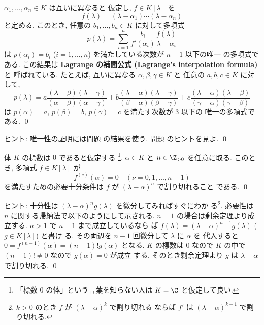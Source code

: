 \documentclass[12pt,twoside]{jarticle}
\begin{document}

\begin{question}
\label{q:Lagrange-interpolation-2}
  $\alpha_1,\dots,\alpha_n\in K$ は互いに異なると
  仮定し, $f\in K[\lambda]$ を
  \begin{equation*}
    f(\lambda)=(\lambda-\alpha_1)\cdots(\lambda-\alpha_n)
  \end{equation*}
  と定める. このとき, 任意の $b_1,\dots,b_n\in K$ に対して多項式
  \begin{equation*}
    p(\lambda) = 
    \sum_{i=1}^n 
    \frac{b_i}{f'(\alpha_i)}
    \frac{f(\lambda)}{\lambda-\alpha_i}
  \end{equation*}
  は $p(\alpha_i)=b_i$ ($i=1,\dots,n$) を満たしている次数が $n-1$ 以下の唯一
  の多項式である.
  この結果は {\bf Lagrange の補間公式 (Lagrange's interpolation formula)} と
  呼ばれている.   
  たとえば, 互いに異なる $\alpha,\beta,\gamma\in K$ と
  任意の $a,b,c\in K$ に対して,
  \begin{equation*}
    p(\lambda)=
    a \frac{(\lambda-\beta)(\lambda-\gamma)}{(\alpha-\beta)(\alpha-\gamma)} +
    b \frac{(\lambda-\alpha)(\lambda-\gamma)}{(\beta-\alpha)(\beta-\gamma)} +
    c \frac{(\lambda-\alpha)(\lambda-\beta)}{(\gamma-\alpha)(\gamma-\beta)} 
  \end{equation*}
  は $p(\alpha)=a$, $p(\beta)=b$, $p(\gamma)=c$ を満たす次数が $3$ 以下の
  唯一の多項式である. 
  \qed
\end{question}

\noindent
ヒント: 唯一性の証明には問題  の結果を使う.
問題  のヒントを見よ.
\qed


\begin{question}
\label{q:Lagrange-interpolation-3}
  体 $K$ の標数は $0$ であると仮定する%
  \footnote{「標数 $0$ の体」という言葉を知らない人は $K=\C$ と仮定して良い.}.
  $\alpha\in K$ と $n\in\Z_{>0}$ を任意に取る.
  このとき, 多項式 $f\in K[\lambda]$ が
  \begin{equation*}
    f^{(\nu)}(\alpha) = 0
    \quad (\nu=0,1,\dots,n-1)
  \end{equation*}
  を満たすための必要十分条件は $f$ が $(\lambda-\alpha)^n$ で割り切れること
  である. 
  \qed
\end{question}

\noindent
ヒント: 十分性は $(\lambda-\alpha)^n g(\lambda)$ を微分してみればすぐにわか
る\footnote{$k>0$ のとき $f$ が $(\lambda-\alpha)^k$ で割り切れる
ならば $f'$ は $(\lambda-\alpha)^{k-1}$ で割り切れる.}. 
必要性は $n$ に関する帰納法で以下のようにして示される.
$n=1$ の場合は剰余定理より成立する. $n>1$ で $n-1$ まで成立しているなら
ば $f(\lambda)=(\lambda-\alpha)^{n-1}g(\lambda)$ ($g\in K[\lambda]$) と書け
る.  その両辺を $n-1$ 回微分して $\lambda$ に $\alpha$ を
代入すると $0=f^{(n-1)}(\alpha)=(n-1)!g(\alpha)$ となる.
$K$ の標数は $0$ なので $K$ の中で $(n-1)!\ne 0$ なので $g(\alpha)=0$ が成立
する.  そのとき剰余定理より $g$ は $\lambda-\alpha$ で割り切れる.
\qed
\end{document}
